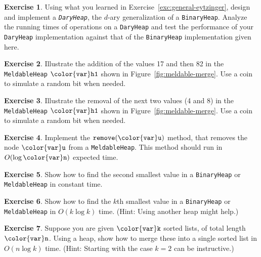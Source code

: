 \documentclass[10pt]{book}
\newcommand{\figref}[1]{Figure~\ref{fig:#1}}
\theoremstyle{plain}
\theoremstyle{definition}
\newtheorem{exc}{Exercise}[chapter]
\newcommand{\excref}[1]{Exercise~\ref{exc:#1}}
\begin{document}
\begin{exc}
  Using what you learned in \excref{general-eytzinger}, design and
  implement a \emph{\texttt{DaryHeap}}, the $d$-ary generalization of a
  \texttt{BinaryHeap}. Analyze the running times of operations on a \texttt{DaryHeap}
  and test the performance of your \texttt{DaryHeap} implementation against
  that of the \texttt{BinaryHeap} implementation given here.
\end{exc}



\begin{exc}
  Illustrate the addition of the values 17 and then 82 in the
  \texttt{MeldableHeap} \ensuremath{\mathtt{{\color{var}h1}}} shown in \figref{meldable-merge}.  Use a coin to
  simulate a random bit when needed.
\end{exc}

\begin{exc}
  Illustrate the removal of the next two values (4 and 8) in the
  \texttt{MeldableHeap} \ensuremath{\mathtt{{\color{var}h1}}} shown in \figref{meldable-merge}.  Use a coin to
  simulate a random bit when needed.
\end{exc}

\begin{exc}
  Implement the \ensuremath{\mathtt{remove({\color{var}u})}} method, that removes the node \ensuremath{\mathtt{{\color{var}u}}} from
  a \texttt{MeldableHeap}.  This method should run in $O(\log \ensuremath{\mathtt{{\color{var}n}}})$ expected time.
\end{exc}

\begin{exc}
  Show how to find the second smallest value in a \texttt{BinaryHeap} or
  \texttt{MeldableHeap} in constant time.
\end{exc}

\begin{exc}
  Show how to find the $k$th smallest value in a \texttt{BinaryHeap} or
  \texttt{MeldableHeap} in $O(k\log k)$ time.  (Hint: Using another heap
  might help.)
\end{exc}

\begin{exc}
  Suppose you are given \ensuremath{\mathtt{{\color{var}k}}} sorted lists, of total length \ensuremath{\mathtt{{\color{var}n}}}.  Using
  a heap, show how to merge these into a single sorted list in $O(n\log
  k)$ time.  (Hint: Starting with the case $k=2$ can be instructive.)
\end{exc}
\end{document}

